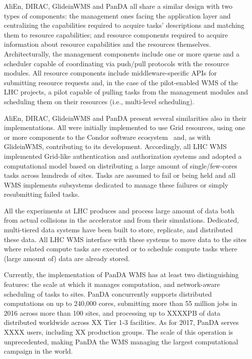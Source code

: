 AliEn, DIRAC, GlideinWMS and PanDA all share a similar design with two types of
components: the management ones facing the application layer and centralizing
the capabilities required to acquire tasks' descriptions and matching them to
resource capabilities; and resource components required to acquire information
about resource capabilities and the resources themselves. Architecturally, the
management components include one or more queue and a scheduler capable of
coordinating via push/pull protocols with the resource modules. All resource
components include middleware-specific APIs for submitting resource requests
and, in the case of the pilot-enabled WMS of the LHC projects, a pilot capable
of pulling tasks from the management modules and scheduling them on their
resources (i.e., multi-level scheduling).

AliEn, DIRAC, GlideinWMS and PanDA present several similarities also in their
implementations. All were initially implemented to use Grid resources, using one
or more components to the Condor software ecosystem~\cite{thain2005distributed}
and, as with GlideinWMS, contributing to its development. Accordingly, all LHC
WMS implemented Grid-like authentication and authorization systems and adopted a
computational model based on distributing a large amount of single/few-cores
tasks across hundreds of sites. Tasks are assumed to fail
or being held and all WMS implements subsystems dedicated to manage these
failures or simply resubmitting failed tasks.

All the experiments at LHC produces and process large amount of data both from
actual collisions in the accelerator and from their simulations. Dedicated,
multi-tiered data systems have been built to store, replicate, and distributed
these data. All LHC WMS interface with these systems to move data to the sites
where related compute tasks are executed or to schedule compute tasks where
(large amount of) data are already stored.

Currently, the implementation of PanDA WMS has at least two distinguishing
features: the scale at which it manages computation, and network-aware
scheduling of tasks to sites. PanDA concurrently supports distributed
computations on up to 240,000 cores, submitting more than 55 million jobs in
2016 across more than 100 sites, and processing up to XXXXPB of data
distributed worldwide across XX Tier 1-3 facilities. As for 2017, PanDA serves
XXXX users, including XX production groups. The scale of this operation is
unprecedented, making PanDA the WMS managing the largest computational campaign
in the world.


